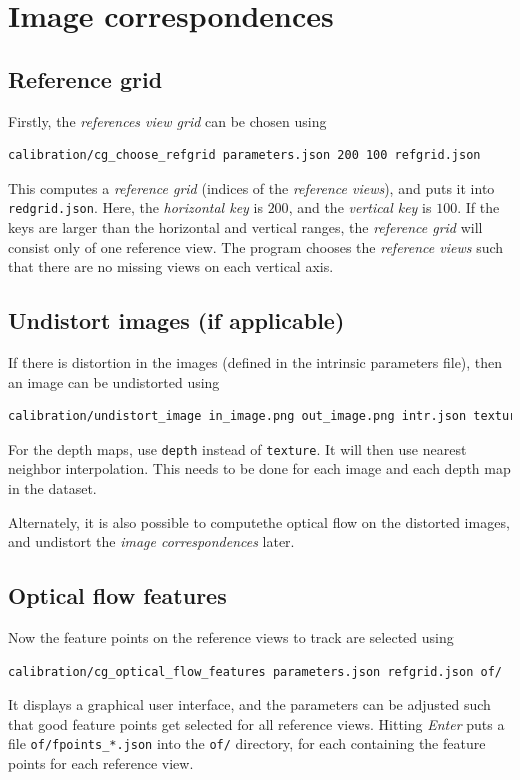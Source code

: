 \documentclass{scrreprt}
\begin{document}
\section{Image correspondences}

\subsection{Reference grid}
Firstly, the \emph{references view grid} can be chosen using
\begin{lstlisting}[language=bash]
calibration/cg_choose_refgrid parameters.json 200 100 refgrid.json
\end{lstlisting}
This computes a \emph{reference grid} (indices of the \emph{reference views}), and puts it into \texttt{redgrid.json}. Here, the \emph{horizontal key} is $200$, and the \emph{vertical key} is $100$. If the keys are larger than the horizontal and vertical ranges, the \emph{reference grid} will consist only of one reference view. The program chooses the \emph{reference views} such that there are no missing views on each vertical axis.

\subsection{Undistort images (if applicable)}
If there is distortion in the images (defined in the intrinsic parameters file), then an image can be undistorted using
\begin{lstlisting}[language=bash]
calibration/undistort_image in_image.png out_image.png intr.json texture
\end{lstlisting}
For the depth maps, use \texttt{depth} instead of \texttt{texture}. It will then use nearest neighbor interpolation. This needs to be done for each image and each depth map in the dataset.

Alternately, it is also possible to computethe optical flow on the distorted images, and undistort the \emph{image correspondences} later.

\subsection{Optical flow features}
Now the feature points on the reference views to track are selected using
\begin{lstlisting}[language=bash]
calibration/cg_optical_flow_features parameters.json refgrid.json of/
\end{lstlisting}
It displays a graphical user interface, and the parameters can be adjusted such that good feature points get selected for all reference views. Hitting \emph{Enter} puts a file \texttt{of/fpoints\_*.json} into the \texttt{of/} directory, for each containing the feature points for each reference view.
\end{document}
